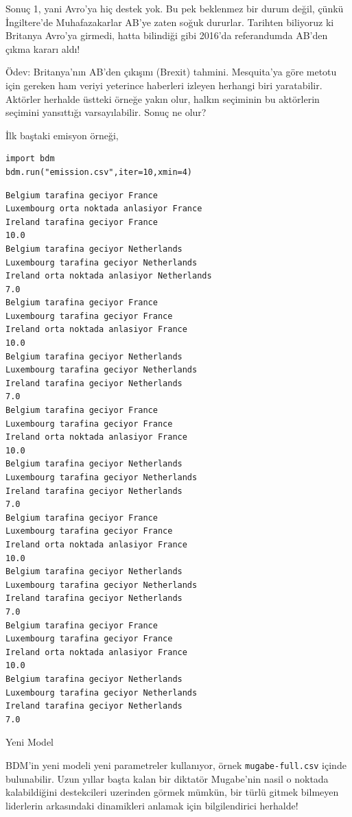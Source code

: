 \documentclass[12pt,fleqn]{article}\usepackage{../../common}
\begin{document}
Sonuç 1, yani Avro'ya hiç destek yok. Bu pek beklenmez bir durum değil, çünkü
İngiltere'de Muhafazakarlar AB'ye zaten soğuk dururlar. Tarihten biliyoruz ki
Britanya Avro'ya girmedi, hatta bilindiği gibi 2016'da referandumda AB'den çıkma
kararı aldı!

Ödev: Britanya'nın AB'den çıkışını (Brexit) tahmini.  Mesquita'ya göre metotu
için gereken ham veriyi yeterince haberleri izleyen herhangi biri
yaratabilir. Aktörler herhalde üstteki örneğe yakın olur, halkın seçiminin bu
aktörlerin seçimini yansıttığı varsayılabilir. Sonuç ne olur?

İlk baştaki emisyon örneği,

\begin{verbatim}
import bdm
bdm.run("emission.csv",iter=10,xmin=4)
\end{verbatim}

\begin{verbatim}
Belgium tarafina geciyor France
Luxembourg orta noktada anlasiyor France
Ireland tarafina geciyor France
10.0
Belgium tarafina geciyor Netherlands
Luxembourg tarafina geciyor Netherlands
Ireland orta noktada anlasiyor Netherlands
7.0
Belgium tarafina geciyor France
Luxembourg tarafina geciyor France
Ireland orta noktada anlasiyor France
10.0
Belgium tarafina geciyor Netherlands
Luxembourg tarafina geciyor Netherlands
Ireland tarafina geciyor Netherlands
7.0
Belgium tarafina geciyor France
Luxembourg tarafina geciyor France
Ireland orta noktada anlasiyor France
10.0
Belgium tarafina geciyor Netherlands
Luxembourg tarafina geciyor Netherlands
Ireland tarafina geciyor Netherlands
7.0
Belgium tarafina geciyor France
Luxembourg tarafina geciyor France
Ireland orta noktada anlasiyor France
10.0
Belgium tarafina geciyor Netherlands
Luxembourg tarafina geciyor Netherlands
Ireland tarafina geciyor Netherlands
7.0
Belgium tarafina geciyor France
Luxembourg tarafina geciyor France
Ireland orta noktada anlasiyor France
10.0
Belgium tarafina geciyor Netherlands
Luxembourg tarafina geciyor Netherlands
Ireland tarafina geciyor Netherlands
7.0
\end{verbatim}

Yeni Model

BDM'in yeni modeli yeni parametreler kullanıyor, örnek \verb!mugabe-full.csv!
içinde bulunabilir. Uzun yıllar başta kalan bir diktatör Mugabe'nin nasil o
noktada kalabildiğini destekcileri uzerinden görmek mümkün, bir türlü gitmek
bilmeyen liderlerin arkasındaki dinamikleri anlamak için bilgilendirici
herhalde!
\end{document}
